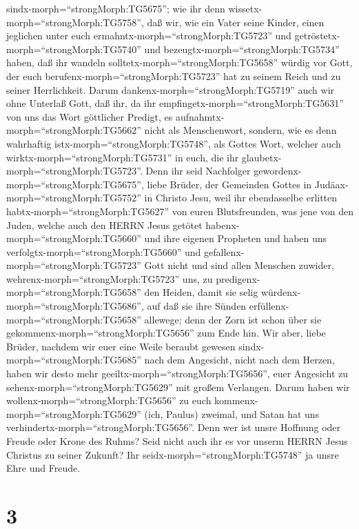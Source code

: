 sindx-morph=``strongMorph:TG5675'';  wie ihr denn
wissetx-morph=``strongMorph:TG5758'', daß wir, wie ein Vater seine
Kinder, einen jeglichen unter euch ermahntx-morph=``strongMorph:TG5723''
und getröstetx-morph=``strongMorph:TG5740''  und
bezeugtx-morph=``strongMorph:TG5734'' haben, daß ihr wandeln
solltetx-morph=``strongMorph:TG5658'' würdig vor Gott, der euch
berufenx-morph=``strongMorph:TG5723'' hat zu seinem Reich und zu seiner
Herrlichkeit.  Darum dankenx-morph=``strongMorph:TG5719''
auch wir ohne Unterlaß Gott, daß ihr, da ihr
empfingetx-morph=``strongMorph:TG5631'' von uns das Wort göttlicher
Predigt, es aufnahmtx-morph=``strongMorph:TG5662'' nicht als
Menschenwort, sondern, wie es denn wahrhaftig
istx-morph=``strongMorph:TG5748'', als Gottes Wort, welcher auch
wirktx-morph=``strongMorph:TG5731'' in euch, die ihr
glaubetx-morph=``strongMorph:TG5723''.  Denn ihr seid
Nachfolger gewordenx-morph=``strongMorph:TG5675'', liebe Brüder, der
Gemeinden Gottes in Judäax-morph=``strongMorph:TG5752'' in Christo Jesu,
weil ihr ebendasselbe erlitten habtx-morph=``strongMorph:TG5627'' von
euren Blutsfreunden, was jene von den Juden,  welche auch
den HERRN Jesus getötet habenx-morph=``strongMorph:TG5660'' und ihre
eigenen Propheten und haben uns verfolgtx-morph=``strongMorph:TG5660''
und gefallenx-morph=``strongMorph:TG5723'' Gott nicht und sind allen
Menschen zuwider,  wehrenx-morph=``strongMorph:TG5723''
uns, zu predigenx-morph=``strongMorph:TG5658'' den Heiden, damit sie
selig würdenx-morph=``strongMorph:TG5686'', auf daß sie ihre Sünden
erfüllenx-morph=``strongMorph:TG5658'' allewege; denn der Zorn ist schon
über sie gekommenx-morph=``strongMorph:TG5656'' zum Ende hin.
 Wir aber, liebe Brüder, nachdem wir euer eine Weile
beraubt gewesen sindx-morph=``strongMorph:TG5685'' nach dem Angesicht,
nicht nach dem Herzen, haben wir desto mehr
geeiltx-morph=``strongMorph:TG5656'', euer Angesicht zu
sehenx-morph=``strongMorph:TG5629'' mit großem Verlangen. 
Darum haben wir wollenx-morph=``strongMorph:TG5656'' zu euch
kommenx-morph=``strongMorph:TG5629'' (ich, Paulus) zweimal, und Satan
hat uns verhindertx-morph=``strongMorph:TG5656''.  Denn wer
ist unsre Hoffnung oder Freude oder Krone des Ruhms? Seid nicht auch ihr
es vor unserm HERRN Jesus Christus zu seiner Zukunft?  Ihr
seidx-morph=``strongMorph:TG5748'' ja unsre Ehre und Freude.

\hypertarget{section-2}{%
\section{3}\label{section-2}}

